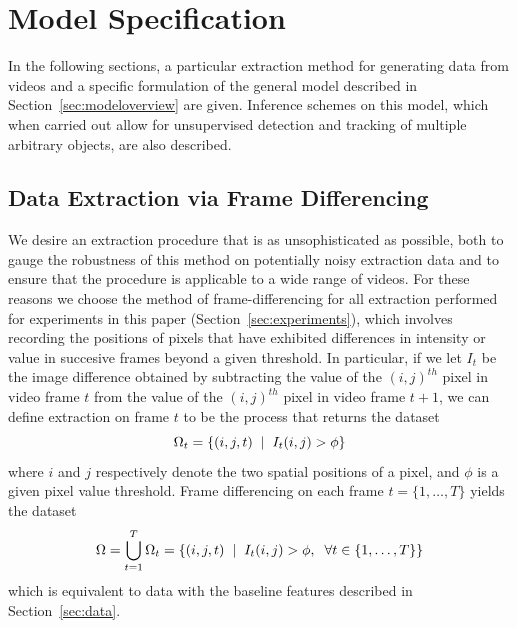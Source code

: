 \documentclass[twocolumn, final]{svjour3}
\begin{document}

\section{Model Specification}
\label{sec:modelspec}

In the following sections, a particular extraction method for generating data from videos and a specific formulation of the general model described in Section~\ref{sec:modeloverview} are given. Inference schemes on this model, which when carried out allow for unsupervised detection and tracking of multiple arbitrary objects, are also described.






\subsection{Data Extraction via Frame Differencing}
\label{sec:modelspec_extraction}

We desire an extraction procedure that is as unsophisticated as possible, both to gauge the robustness of this method on potentially noisy extraction data and to ensure that the procedure is applicable to a wide range of videos. For these reasons we choose the method of frame-differencing for all extraction performed for experiments in this paper (Section~\ref{sec:experiments}), which involves recording the positions of pixels that have exhibited differences in intensity or value in succesive frames beyond a given threshold. In particular, if we let $I_{t}$ be the image difference obtained by subtracting the value of the $(i,j)^{th}$ pixel in video frame $t$ from the value of the $(i,j)^{th}$ pixel in video frame $t+1$, we can define extraction on frame $t$ to be the process that returns the dataset
\begin{equation}
	\Omega_{t} = \{ (i,j,t) \hspace{2mm} | \hspace{2mm} I_{t}(i,j) > \phi \}
\end{equation}
where $i$ and $j$ respectively denote the two spatial positions of a pixel, and $\phi$ is a given pixel value threshold. Frame differencing on each frame $t =\{1, \ldots, T \}$ yields the dataset
\begin{equation}
	\Omega = \bigcup_{t=1}^{T} \Omega_{t} = \{ (i,j,t) \hspace{2mm} | \hspace{2mm} I_{t}(i,j) > \phi,  \hspace{2mm}  \forall t \in \{1, \ldots, T \} \}
\end{equation}
which is equivalent to data with the baseline features described in Section~\ref{sec:data}.
\end{document}
